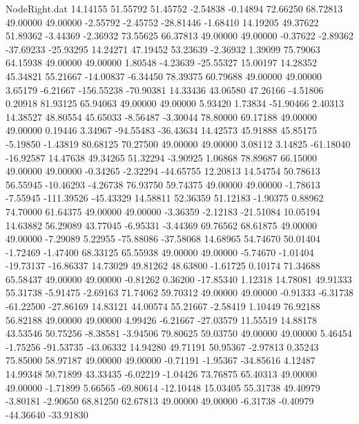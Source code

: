 \begin{filecontents}{NodeRight.dat}
  14.14155   51.55792   51.45752    -2.54838   -0.14894   72.66250   68.72813   49.00000   49.00000   -2.55792   -2.45752  -28.81446   -1.68410
  14.19205   49.37622   51.89362    -3.44369   -2.36932   73.55625   66.37813   49.00000   49.00000   -0.37622   -2.89362  -37.69233  -25.93295
  14.24271   47.19452   53.23639    -2.36932    1.39099   75.79063   64.15938   49.00000   49.00000    1.80548   -4.23639  -25.55327   15.00197
  14.28352   45.34821   55.21667   -14.00837   -6.34450   78.39375   60.79688   49.00000   49.00000    3.65179   -6.21667 -156.55238  -70.90381
  14.33436   43.06580   47.26166    -4.51806    0.20918   81.93125   65.94063   49.00000   49.00000    5.93420    1.73834  -51.90466    2.40313
  14.38527   48.80554   45.65033    -8.56487   -3.30044   78.80000   69.17188   49.00000   49.00000    0.19446    3.34967  -94.55483  -36.43634
  14.42573   45.91888   45.85175    -5.19850   -1.43819   80.68125   70.27500   49.00000   49.00000    3.08112    3.14825  -61.18040  -16.92587
  14.47638   49.34265   51.32294    -3.90925    1.06868   78.89687   66.15000   49.00000   49.00000   -0.34265   -2.32294  -44.65755   12.20813
  14.54754   50.78613   56.55945   -10.46293   -4.26738   76.93750   59.74375   49.00000   49.00000   -1.78613   -7.55945 -111.39526  -45.43329
  14.58811   52.36359   51.12183    -1.90375    0.88962   74.70000   61.64375   49.00000   49.00000   -3.36359   -2.12183  -21.51084   10.05194
  14.63882   56.29089   43.77045    -6.95331   -3.44369   69.76562   68.61875   49.00000   49.00000   -7.29089    5.22955  -75.88086  -37.58068
  14.68965   54.74670   50.01404    -1.72469   -1.47400   68.33125   65.55938   49.00000   49.00000   -5.74670   -1.01404  -19.73137  -16.86337
  14.73029   49.81262   48.63800    -1.61725    0.10174   71.34688   65.58437   49.00000   49.00000   -0.81262    0.36200  -17.85340    1.12318
  14.78081   49.91333   55.31738    -5.91475   -2.69163   71.74062   59.70312   49.00000   49.00000   -0.91333   -6.31738  -61.22500  -27.86169
  14.83121   44.00574   55.21667    -2.58419    1.10449   76.92188   56.82188   49.00000   49.00000    4.99426   -6.21667  -27.03579   11.55519
  14.88178   43.53546   50.75256    -8.38581   -3.94506   79.80625   59.03750   49.00000   49.00000    5.46454   -1.75256  -91.53735  -43.06332
  14.94280   49.71191   50.95367    -2.97813    0.35243   75.85000   58.97187   49.00000   49.00000   -0.71191   -1.95367  -34.85616    4.12487
  14.99348   50.71899   43.33435    -6.02219   -1.04426   73.76875   65.40313   49.00000   49.00000   -1.71899    5.66565  -69.80614  -12.10448
  15.03405   55.31738   49.40979    -3.80181   -2.90650   68.81250   62.67813   49.00000   49.00000   -6.31738   -0.40979  -44.36640  -33.91830

\end{filecontents}
